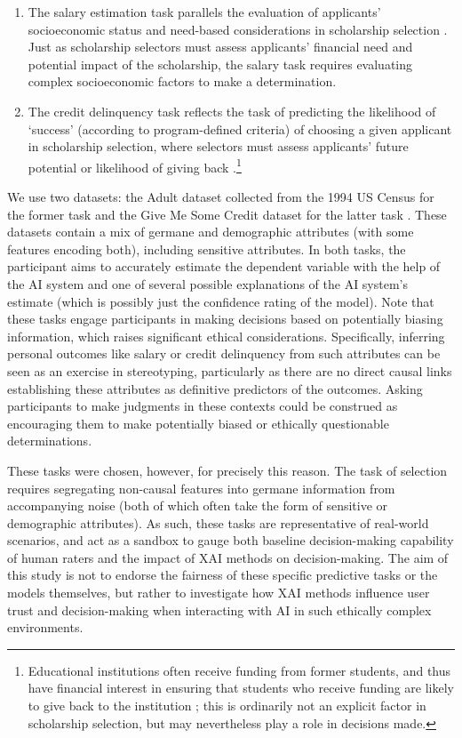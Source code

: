\begin{enumerate}
    \item The salary estimation task parallels the evaluation of applicants' socioeconomic status and need-based considerations in scholarship selection \cite{Warikoo_2019}. Just as scholarship selectors must assess applicants' financial need and potential impact of the scholarship, the salary task requires evaluating complex socioeconomic factors to make a determination.
    \item The credit delinquency task reflects the task of predicting the likelihood of `success' (according to program-defined criteria) of choosing a given applicant in scholarship selection, where selectors must assess applicants' future potential or likelihood of giving back \cite{schumann2017diverse}.\footnote{Educational institutions often receive funding from former students, and thus have financial interest in ensuring that students who receive funding are likely to give back to the institution \cite{Stephenson_Yerger_2014}; this is ordinarily not an explicit factor in scholarship selection, but may nevertheless play a role in decisions made.}
\end{enumerate}

We use two datasets: the Adult dataset collected from the 1994 US Census for the former task and the Give Me Some Credit dataset for the latter task \cite{kohavi_scaling_1996, GiveMeSomeCredit}. These datasets contain a mix of germane and demographic attributes (with some features encoding both), including sensitive attributes. In both tasks, the participant aims to accurately estimate the dependent variable with the help of the AI system and one of several possible explanations of the AI system's estimate (which is possibly just the confidence rating of the model). Note that these tasks engage participants in making decisions based on potentially biasing information, which raises significant ethical considerations. Specifically, inferring personal outcomes like salary or credit delinquency from such attributes can be seen as an exercise in stereotyping, particularly as there are no direct causal links establishing these attributes as definitive predictors of the outcomes. Asking participants to make judgments in these contexts could be construed as encouraging them to make potentially biased or ethically questionable determinations.

These tasks were chosen, however, for precisely this reason. The task of selection requires segregating non-causal features into germane information from accompanying noise (both of which often take the form of sensitive or demographic attributes). As such, these tasks are representative of real-world scenarios, and act as a sandbox to gauge both baseline decision-making capability of human raters and the impact of XAI methods on decision-making. The aim of this study is not to endorse the fairness of these specific predictive tasks or the models themselves, but rather to investigate how XAI methods influence user trust and decision-making when interacting with AI in such ethically complex environments. 


